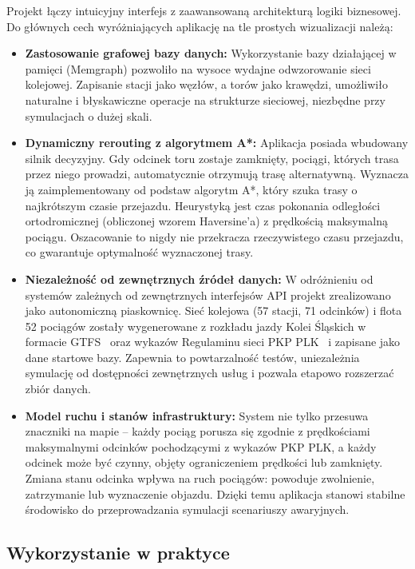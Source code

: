 \documentclass[twoside]{projektInzynierskiMS1z}
\begin{document}
Projekt łączy intuicyjny interfejs z zaawansowaną architekturą logiki biznesowej.
Do głównych cech wyróżniających aplikację na tle prostych wizualizacji należą:

\begin{itemize}
\item \textbf{Zastosowanie grafowej bazy danych:} Wykorzystanie bazy działającej
w pamięci (Memgraph) pozwoliło na wysoce wydajne odwzorowanie sieci kolejowej.
Zapisanie stacji jako węzłów, a torów jako krawędzi, umożliwiło naturalne
i błyskawiczne operacje na strukturze sieciowej, niezbędne przy symulacjach
o dużej skali.

\item \textbf{Dynamiczny rerouting z algorytmem A*:} Aplikacja posiada wbudowany
silnik decyzyjny. Gdy odcinek toru zostaje zamknięty, pociągi, których trasa
przez niego prowadzi, automatycznie otrzymują trasę alternatywną. Wyznacza ją
zaimplementowany od podstaw algorytm A*, który szuka trasy o najkrótszym czasie
przejazdu. Heurystyką jest czas pokonania odległości ortodromicznej (obliczonej
wzorem Haversine'a) z prędkością maksymalną pociągu. Oszacowanie to nigdy nie
przekracza rzeczywistego czasu przejazdu, co gwarantuje optymalność wyznaczonej
trasy.

\item \textbf{Niezależność od zewnętrznych źródeł danych:} W odróżnieniu od
systemów zależnych od zewnętrznych interfejsów API projekt zrealizowano jako
autonomiczną piaskownicę. Sieć kolejowa (57 stacji, 71 odcinków) i flota
52 pociągów zostały wygenerowane z rozkładu jazdy Kolei Śląskich w formacie
GTFS~\cite{gtfsks} oraz wykazów Regulaminu sieci PKP PLK~\cite{plkregulamin}
i zapisane jako dane startowe bazy. Zapewnia to powtarzalność testów,
uniezależnia symulację od dostępności zewnętrznych usług i pozwala etapowo
rozszerzać zbiór danych.

\item \textbf{Model ruchu i stanów infrastruktury:} System nie tylko przesuwa
znaczniki na mapie -- każdy pociąg porusza się zgodnie z prędkościami
maksymalnymi odcinków pochodzącymi z wykazów PKP PLK, a każdy odcinek może być
czynny, objęty ograniczeniem prędkości lub zamknięty. Zmiana stanu odcinka
wpływa na ruch pociągów: powoduje zwolnienie, zatrzymanie lub wyznaczenie
objazdu. Dzięki temu aplikacja stanowi stabilne środowisko do przeprowadzania
symulacji scenariuszy awaryjnych.
\end{itemize}

\subsection{Wykorzystanie w praktyce}
\end{document}
